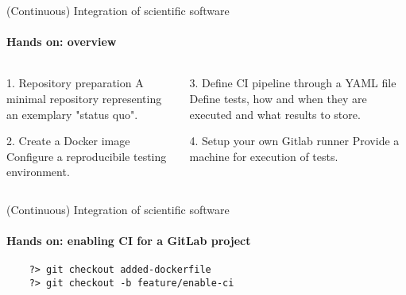 \begin{frame}{(Continuous) Integration of scientific software}
    \framesubtitle{Hands on: overview}
    \begin{columns}
    \begin{column}{0.48\textwidth}
        \begin{block}{1. Repository preparation}
            A minimal repository representing an exemplary
            "status quo".
        \end{block}
        \begin{block}{2. Create a Docker image}
            Configure a reproducibile testing environment.
        \end{block}
    \end{column}

    \begin{column}{0.48\textwidth}
        \begin{exampleblock}{3. Define CI pipeline through a YAML file}
            Define tests, how and when they are executed and what
            results to store.
        \end{exampleblock}
        \begin{block}{4. Setup your own Gitlab runner}
            Provide a machine for execution of tests.
        \end{block}
    \end{column}
    \end{columns}
\end{frame}

\begin{frame}[fragile]{(Continuous) Integration of scientific software} 
    \framesubtitle{Hands on: enabling CI for a GitLab project } 

    \vfill

    \begin{verbatim}
    ?> git checkout added-dockerfile 
    ?> git checkout -b feature/enable-ci
    \end{verbatim}

\end{frame}

